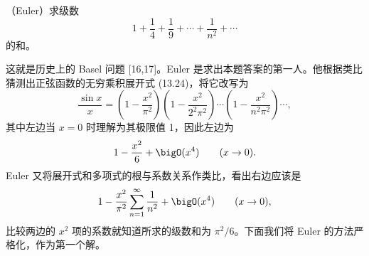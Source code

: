 \begin{xexample}[16.2.2]
（Euler）求级数
\[
  1+\frac14+\frac19+\cdots+\frac1{n^2}+\cdots
\]
的和。
\end{xexample}

这就是历史上的 Basel 问题 [16,17]。Euler 是求出本题答案的第一人。他根据类比猜测出正弦函数的无穷乘积展开式 (13.24)，将它改写为
\[
  \frac{\sin x}{x}=\left(1-\frac{x^2}{\pi^2}\right)
  \left(1-\frac{x^2}{2^2\pi^2}\right)\cdots
  \left(1-\frac{x^2}{n^2\pi^2}\right)\cdots,
\]
其中左边当 $x=0$ 时理解为其极限值 1，因此左边为
\[
  1-\frac{x^2}{6}+\bigO(x^4)\qquad(x\to0).
\]
Euler 又将展开式和多项式的根与系数关系作类比，看出右边应该是
\[
  1-\frac{x^2}{\pi^2}\sum_{n=1}^{\infty}\frac1{n^2}+\bigO(x^4)\qquad(x\to0),
\]
比较两边的 $x^2$ 项的系数就知道所求的级数和为 $\pi^2/6$。下面我们将 Euler 的方法严格化，作为第一个解。


